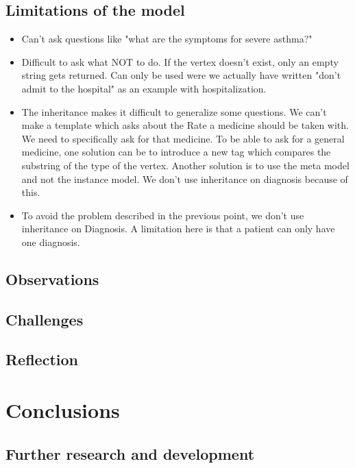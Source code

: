 \documentclass[a4paper,12pt]{book}
\begin{document}
\section{Limitations of the model}
\begin{itemize}
	\item Can't ask questions like "what are the symptoms for severe asthma?"
	\item Difficult to ask what NOT to do. If the vertex doesn't exist, only an empty string gets returned. Can only be used were we actually have written "don't admit to the hospital" as an example with hospitalization.
	\item The inheritance makes it difficult to generalize some questions. We can't make a template which asks about the Rate a medicine should be taken with. We need to specifically ask for that medicine. To be able to ask for a general medicine, one solution can be to introduce a new tag which compares the substring of the type of the vertex. Another solution is to use the meta model and not the instance model. We don't use inheritance on diagnosis because of this.
	\item To avoid the problem described in the previous point, we don't use inheritance on Diagnosis. A limitation here is that  
	a patient can only have one diagnosis.
\end{itemize}
\section{Observations}
\section{Challenges}
\section{Reflection}



\chapter{Conclusions}
\section{Further research and development}


\backmatter
\end{document}
